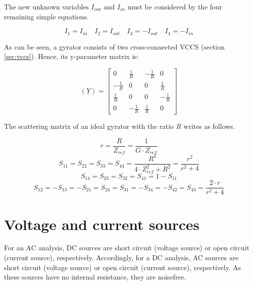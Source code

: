 The new unknown variables $I_{out}$ and $I_{in}$ must be considered by
the four remaining simple equations.

\begin{equation}
I_{1} = I_{in} \quad I_{2} = I_{out} \quad I_{3} = -I_{out} \quad I_{4} = -I_{in}
\end{equation}

As can be seen, a gyrator consists of two cross-connected VCCS
(section \ref{sec:vccs}). Hence, its y-parameter matrix is:

\begin{equation}
(\underline{Y}) =
\begin{bmatrix}
0&\frac{1}{R}&-\frac{1}{R}&0\\
-\frac{1}{R}&0&0&\frac{1}{R}\\
\frac{1}{R}&0&0&-\frac{1}{R}\\
0&-\frac{1}{R}&\frac{1}{R}&0
\end{bmatrix}
\end{equation}

The scattering matrix
of an ideal gyrator with the ratio $R$ writes as follows.

\begin{equation}
r = \frac{R}{Z_{ref}} = \frac{1}{G\cdot Z_{ref}}
\end{equation}
\begin{equation}
S_{11} = S_{22} = S_{33} = S_{44} = \frac{R^2}{4\cdot Z_{ref}^2 + R^2} = \frac{r^2}{r^2+4}
\end{equation}
\begin{equation}
S_{14} = S_{23} = S_{32} = S_{41} = 1-S_{11}
\end{equation}
\begin{equation}
S_{12} = -S_{13} = -S_{21} = S_{24} = S_{31} = -S_{34} = -S_{42} = S_{43} = \frac{2\cdot r}{r^2+4}
\end{equation}


\section{Voltage and current sources}

For an AC analysis, DC sources are short circuit (voltage source)
or open circuit (current source), respectively. Accordingly,
for a DC analysis, AC sources are short circuit (voltage source)
or open circuit (current source), respectively. As these
sources have no internal resistance, they are noisefree.

\addvspace{12pt}

